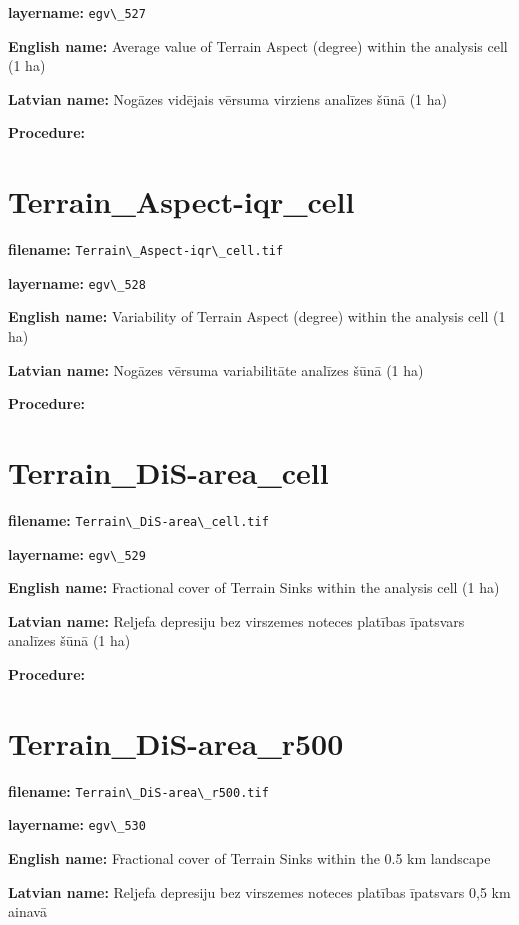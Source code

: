 \documentclass[
]{book}
\newcommand{\passthrough}[1]{#1}
\begin{document}
\textbf{layername:} \passthrough{\lstinline!egv\_527!}

\textbf{English name:} Average value of Terrain Aspect (degree) within the analysis cell (1 ha)

\textbf{Latvian name:} Nogāzes vidējais vērsuma virziens analīzes šūnā (1 ha)

\textbf{Procedure:}

\section{Terrain\_Aspect-iqr\_cell}\label{ch06.528}

\textbf{filename:} \passthrough{\lstinline!Terrain\_Aspect-iqr\_cell.tif!}

\textbf{layername:} \passthrough{\lstinline!egv\_528!}

\textbf{English name:} Variability of Terrain Aspect (degree) within the analysis cell (1 ha)

\textbf{Latvian name:} Nogāzes vērsuma variabilitāte analīzes šūnā (1 ha)

\textbf{Procedure:}

\section{Terrain\_DiS-area\_cell}\label{ch06.529}

\textbf{filename:} \passthrough{\lstinline!Terrain\_DiS-area\_cell.tif!}

\textbf{layername:} \passthrough{\lstinline!egv\_529!}

\textbf{English name:} Fractional cover of Terrain Sinks within the analysis cell (1 ha)

\textbf{Latvian name:} Reljefa depresiju bez virszemes noteces platības īpatsvars analīzes šūnā (1 ha)

\textbf{Procedure:}

\section{Terrain\_DiS-area\_r500}\label{ch06.530}

\textbf{filename:} \passthrough{\lstinline!Terrain\_DiS-area\_r500.tif!}

\textbf{layername:} \passthrough{\lstinline!egv\_530!}

\textbf{English name:} Fractional cover of Terrain Sinks within the 0.5 km landscape

\textbf{Latvian name:} Reljefa depresiju bez virszemes noteces platības īpatsvars 0,5 km ainavā
\end{document}
